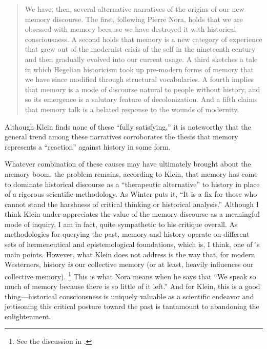 \begin{quote}
    We have, then, several alternative narratives of the origins of our new memory discourse. The first, following Pierre Nora, holds that we are obsessed with memory because we have destroyed it with historical consciousness. A second holds that memory is a new category of experience that grew out of the modernist crisis of the self in the nineteenth century and then gradually evolved into our current usage. A third sketches a tale in which Hegelian historicism took up pre-modern forms of memory that we have since modified through structural vocabularies. A fourth implies that memory is a mode of discourse natural to people without history, and so its emergence is a salutary feature of decolonization. And a fifth claims that memory talk is a belated response to the wounds of modernity.%
        \autocite[134]{klein_klein2011}
\end{quote}  
\noindent
Although Klein finds none of these ``fully satisfying,'' it is noteworthy that the general trend among these narratives corroborates the thesis that memory represents a ``reaction'' against history in some form.  

Whatever combination of these causes may have ultimately brought about the memory boom, the problem remains, according to Klein, that memory has come to dominate historical discourse as a ``therapeutic alternative'' to history in place of a rigorous scientific methodology.%
    \autocite[137]{klein2011}
As Winter puts it, ``It is a fix for those who cannot stand the harshness of critical thinking or historical analysis.''%
    \autocite[283 (summarizing Klein)]{winter2006}
Although I think Klein under-appreciates the value of the memory discourse as a meaningful mode of inquiry, I am in fact, quite sympathetic to his critique overall. As methodologies for querying the past, memory and history operate on different sets of hermeneutical and epistemological foundations, which is, I think, one of \yerushalmi's main points. 
%
%
However, what Klein does not address is the way that, for modern Westerners, history \emph{is} our collective memory (or at least, heavily influences our collective memory).%
    \footnote{%
        See the discussion in
        \cite{schwarz_radstone-schwarz2011}.}    
This is what Nora means when he says that ``We speak so much of memory because there is so little of it left.''%
    \autocite[7]{nora_representations1989}
And for Klein, this is a good thing---historical consciousness is uniquely valuable as a scientific endeavor and jettisoning this critical posture toward the past is tantamount to abandoning the enlightenment.  

